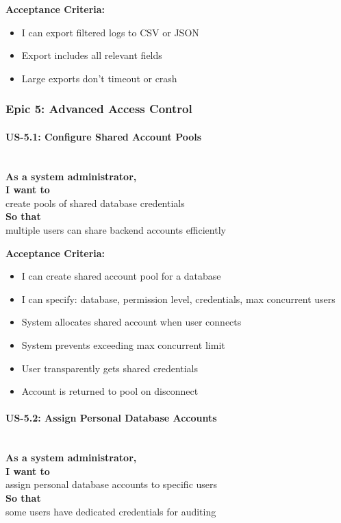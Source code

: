 \noindent\textbf{Acceptance Criteria:}
\begin{itemize}
    \item I can export filtered logs to CSV or JSON
    \item Export includes all relevant fields
    \item Large exports don't timeout or crash
\end{itemize}

\subsubsection{Epic 5: Advanced Access Control}

\paragraph{US-5.1: Configure Shared Account Pools}
\mbox{}\\[0.5em]

\noindent\textbf{As a system administrator,} \\
\textbf{I want to} \\
create pools of shared database credentials \\
\textbf{So that} \\
multiple users can share backend accounts efficiently

\noindent\textbf{Acceptance Criteria:}
\begin{itemize}
    \item I can create shared account pool for a database
    \item I can specify: database, permission level, credentials, max concurrent users
    \item System allocates shared account when user connects
    \item System prevents exceeding max concurrent limit
    \item User transparently gets shared credentials
    \item Account is returned to pool on disconnect
\end{itemize}

\paragraph{US-5.2: Assign Personal Database Accounts}
\mbox{}\\[0.5em]

\noindent\textbf{As a system administrator,} \\
\textbf{I want to} \\
assign personal database accounts to specific users \\
\textbf{So that} \\
some users have dedicated credentials for auditing

